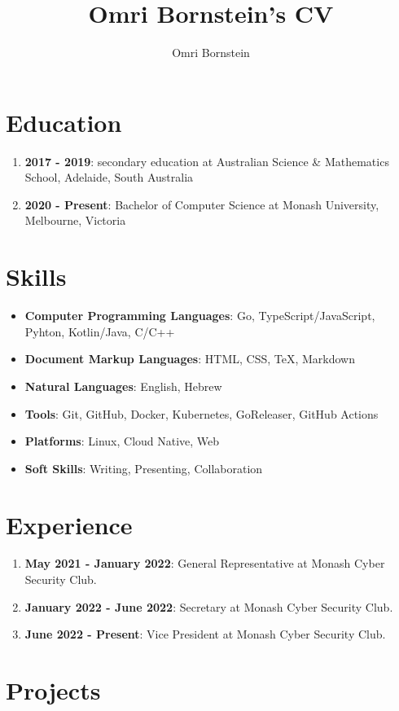\documentclass[a4paper]{article}
\title{Omri Bornstein's CV}
\author{Omri Bornstein}
\begin{document}
	\section*{Education}

	\begin{enumerate}
		\item \textbf{2017 - 2019}: secondary education at Australian Science \& Mathematics School, Adelaide, South Australia
		\item \textbf{2020 - Present}: Bachelor of Computer Science at Monash University, Melbourne, Victoria
	\end{enumerate}

	\section*{Skills}

	\begin{itemize}
		\item \textbf{Computer Programming Languages}: Go, TypeScript/JavaScript, Pyhton, Kotlin/Java, C/C++
		\item \textbf{Document Markup Languages}: HTML, CSS, \TeX, Markdown
		\item \textbf{Natural Languages}: English, Hebrew
		\item \textbf{Tools}: Git, GitHub, Docker, Kubernetes, GoReleaser, GitHub Actions
		\item \textbf{Platforms}: Linux, Cloud Native, Web
		\item \textbf{Soft Skills}: Writing, Presenting, Collaboration
	\end{itemize}

	\section*{Experience}

	\begin{enumerate}
		\item \textbf{May 2021 - January 2022}: General Representative at Monash Cyber Security Club.
		\item \textbf{January 2022 - June 2022}: Secretary at Monash Cyber Security Club.
		\item \textbf{June 2022 - Present}: Vice President at Monash Cyber Security Club.
	\end{enumerate}

	\section*{Projects}
\end{document}
